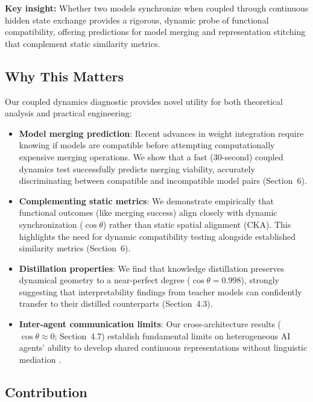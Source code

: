 \documentclass[10pt]{article} %
\theoremstyle{plain}
\theoremstyle{definition}
\theoremstyle{remark}
\begin{document}
\textbf{Key insight:} Whether two models synchronize when coupled through continuous hidden state exchange provides a rigorous, dynamic probe of functional compatibility, offering predictions for model merging and representation stitching that complement static similarity metrics.

\subsection{Why This Matters}

Our coupled dynamics diagnostic provides novel utility for both theoretical analysis and practical engineering:

\begin{itemize}
    \item \textbf{Model merging prediction}: Recent advances in weight integration require knowing if models are compatible before attempting computationally expensive merging operations. We show that a fast (30-second) coupled dynamics test successfully predicts merging viability, accurately discriminating between compatible and incompatible model pairs (Section~6).
    
    \item \textbf{Complementing static metrics}: We demonstrate empirically that functional outcomes (like merging success) align closely with dynamic synchronization ($\cos \theta$) rather than static spatial alignment (CKA). This highlights the need for dynamic compatibility testing alongside established similarity metrics (Section~6).
    
    \item \textbf{Distillation properties}: We find that knowledge distillation preserves dynamical geometry to a near-perfect degree ($\cos \theta = 0.998$), strongly suggesting that interpretability findings \citep{elhage2021mathematical} from teacher models can confidently transfer to their distilled counterparts (Section~4.3).
    
    \item \textbf{Inter-agent communication limits}: Our cross-architecture results ($\cos \theta \approx 0$; Section~4.7) establish fundamental limits on heterogeneous AI agents' ability to develop shared continuous representations without linguistic mediation \citep{moschella2023relative}.
\end{itemize}

\subsection{Contribution}
\end{document}
